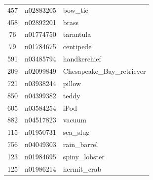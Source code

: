 \begin{table}
\begin{tabular}{cll}
457 & n02883205 & bow_tie \\
458 & n02892201 & brass \\
76 & n01774750 & tarantula \\
79 & n01784675 & centipede \\
591 & n03485794 & handkerchief \\
209 & n02099849 & Chesapeake_Bay_retriever \\
721 & n03938244 & pillow \\
850 & n04399382 & teddy \\
605 & n03584254 & iPod \\
882 & n04517823 & vacuum \\
115 & n01950731 & sea_slug \\
756 & n04049303 & rain_barrel \\
123 & n01984695 & spiny_lobster \\
125 & n01986214 & hermit_crab \\
\bottomrule
\end{tabular}
\end{table}
